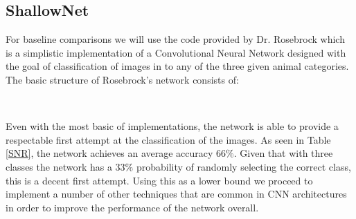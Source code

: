\documentclass[12pt]{article}
\begin{document}
\subsection{ShallowNet}
For baseline comparisons we will use the code provided by Dr. Rosebrock \cite{rosebrock} which is a simplistic implementation of a Convolutional Neural Network designed with the goal of classification of images in to any of the three given animal categories. The basic structure of Rosebrock's network consists of:
\begin{center}
	 \\
\end{center}
Even with the most basic of implementations, the network is able to provide a respectable first attempt at the classification of the images. As seen in Table \ref{SNR}, the network achieves an average accuracy $66\%$. Given that with three classes the network has a $33\%$ probability of randomly selecting the correct class, this is a decent first attempt. Using this as a lower bound we proceed to implement a number of other techniques that are common in CNN architectures in order to improve the performance of the network overall. 
\end{document}
